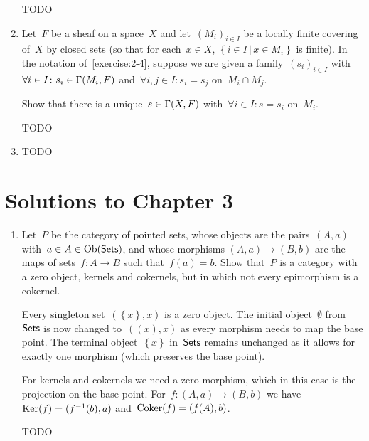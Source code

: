 \documentclass[a4paper,11pt]{article}
\begin{document}
\begin{enumerate}
    \begin{solution}
      TODO
    \end{solution}

  \item Let~$F$ be a sheaf on a space~$X$ and let~$(M_i)_{i\in I}$ be a locally finite covering of~$X$ by closed sets (so that for each~$x\in X$, $\left\{ i\in I\,|\,x\in M_i \right\}$ is finite). In the notation of~\ref{exercise:2-4}, suppose we are given a family~$(s_i)_{i\in I}$ with~$\forall i\in I\colon s_i\in\mathrm{\Gamma}(M_i,F)$ and~$\forall i,j\in I\colon s_i=s_j$ on~$M_i\cap M_j$.

    Show that there is a unique~$s\in\mathrm{\Gamma}(X,F)$ with~$\forall i\in I\colon s=s_i$ on~$M_i$.

    \begin{solution}
      TODO
    \end{solution}

  \item TODO
\end{enumerate}


\section{Solutions to Chapter 3}
\begin{enumerate}
  \item Let~$P$ be the category of pointed sets, whose objects are the pairs~$(A,a)$ with~$a\in A\in\operatorname{Ob}(\textsf{Sets})$, and whose morphisms $(A,a)\to(B,b)$ are the maps of sets~$f\colon A\to B$ such that~$f(a)=b$. Show that~$P$ is a category with a zero object, kernels and cokernels, but in which not every epimorphism is a cokernel.

    \begin{solution}
      Every singleton set~$(\left\{ x \right\},x)$ is a zero object. The initial object~$\emptyset$ from~$\textsf{Sets}$ is now changed to~$(\left( x \right),x)$ as every morphism needs to map the base point. The terminal object~$\left\{ x \right\}$ in~$\textsf{Sets}$ remains unchanged as it allows for exactly one morphism (which preserves the base point).

      For kernels and cokernels we need a zero morphism, which in this case is the projection on the base point. For~$f\colon(A,a)\to(B,b)$ we have~$\operatorname{Ker}(f)=(f^{-1}(b),a)$ and~$\operatorname{Coker}(f)=(f(A),b)$.

      TODO
    \end{solution}
\end{enumerate}



\end{document}
